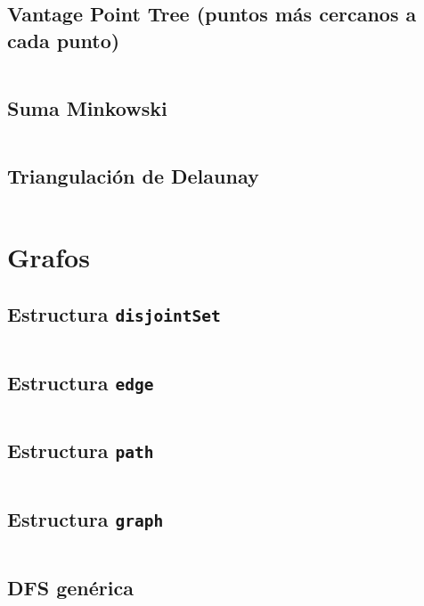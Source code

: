 \documentclass[11pt]{article}
\begin{document}
		\subsection{Vantage Point Tree (puntos más cercanos a cada punto)}
		\inputminted[tabsize=2,breaklines,firstline=276,lastline=339,fontsize=\small]{c++}{geometry.cpp}
		
		\subsection{Suma Minkowski}
		\inputminted[tabsize=2,breaklines,firstline=503,lastline=524,fontsize=\small]{c++}{geometry.cpp}
		
		\subsection{Triangulación de Delaunay}
		\inputminted[tabsize=2,breaklines,firstline=588,lastline=754,fontsize=\small]{c++}{geometry.cpp}
		
	\newpage
	\section{Grafos}
		\subsection{Estructura \texttt{disjointSet}}
		\inputminted[tabsize=2,breaklines,firstline=8,lastline=37,fontsize=\small]{c++}{graph.cpp}
		
		\subsection{Estructura \texttt{edge}}
		\inputminted[tabsize=2,breaklines,firstline=39,lastline=57,fontsize=\small]{c++}{graph.cpp}
		
		\subsection{Estructura \texttt{path}}
		\inputminted[tabsize=2,breaklines,firstline=59,lastline=64,fontsize=\small]{c++}{graph.cpp}
		
		\subsection{Estructura \texttt{graph}}
		\inputminted[tabsize=2,breaklines,firstline=66,lastline=101,fontsize=\small]{c++}{graph.cpp}
		
		\subsection{DFS genérica}
		\inputminted[tabsize=2,breaklines,firstline=411,lastline=429,fontsize=\small]{c++}{graph.cpp}
		
\end{document}
